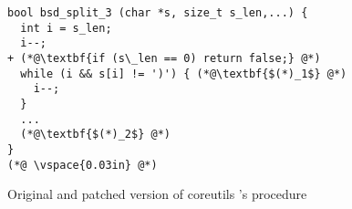 \begin{figure}
\centering
\begin{lstlisting}
bool bsd_split_3 (char *s, size_t s_len,...) {
  int i = s_len;
  i--;
+ (*@\textbf{if (s\_len == 0) return false;} @*)
  while (i && s[i] != ')') { (*@\textbf{$(*)_1$} @*)
    i--;
  }
  ...
  (*@\textbf{$(*)_2$} @*)
}
(*@ \vspace{0.03in} @*)
\end{lstlisting}
%
\caption{Original and patched version of coreutils 's  procedure}
\end{figure} 